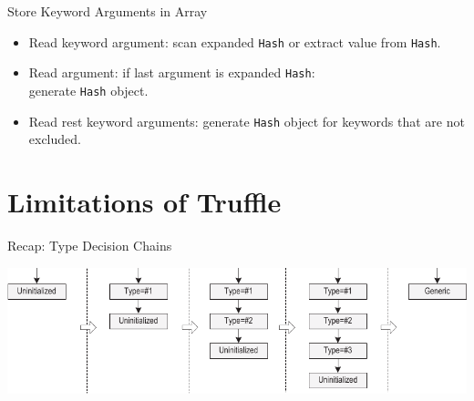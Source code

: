 \documentclass[xcolor=dvipsname,handout]{beamer} %
\begin{document}
%

\begin{frame}{Store Keyword Arguments in Array}
\begin{itemize}
    \item Read keyword argument: scan expanded \lstinline{Hash} or extract value from \lstinline{Hash}.
    \item Read argument: if last argument is expanded \lstinline{Hash}: \\ generate \lstinline{Hash} object.
    \item Read rest keyword arguments: generate \lstinline{Hash} object for keywords that are not excluded.
\end{itemize}
\end{frame}

\section{Limitations of Truffle}
\begin{frame}{Recap: Type Decision Chains}
\begin{table}
    \includegraphics[width=\textwidth]{type_chain.pdf}
\end{table}
\end{frame}
\end{document}
